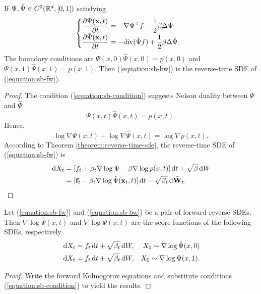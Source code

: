 \begin{theorem}
 If $\Psi,\hat{\Psi}\in C^2(\mathbb{R}^d,[0,1])$ satisfying
 \begin{equation}
  \label{equation:sb-condition}
  \begin{cases}
   \dfrac{\partial\Psi(\mathbf{x},t)}{\partial t} = -\nabla \Psi^\top f-\dfrac{1}{2}\beta\Delta\Psi                      \\
   \dfrac{\partial\hat{\Psi}(\mathbf{x},t)}{\partial t} = -\mathrm{div} (\hat{\Psi} f)+\dfrac{1}{2}\beta\Delta\hat{\Psi} \\
  \end{cases}
 \end{equation}
 The boundary conditions are $\Psi(x,0)\hat{\Psi}(x,0)=p(x,0)$ and $\Psi(x,1)\hat{\Psi}(x,1)=p(x,1)$.
 Then (\ref{equation:sb-bw}) is the reverse-time SDE of (\ref{equation:sb-fw}).
\end{theorem}
\begin{proof}
 The condition (\ref{equation:sb-condition}) suggests Nelson duality between $\Psi$ and $\hat{\Psi}$ \cite{nelson2020dynamical}
 $$\Psi(x,t)\hat{\Psi}(x,t)=p(x,t).$$
 Hence,
 $$\log\nabla\Psi(x,t) + \log\nabla\hat{\Psi}(x,t)=\log\nabla p(x,t).$$
 According to Theorem \ref{theorem:reverse-time-sde}, the reverse-time SDE of (\ref{equation:sb-fw}) is
 \begin{align*}
  \,\mathrm{d} X_t
   & = [f_t + \beta_t\nabla\log \Psi - \beta\nabla\log p(x,t)]\,\mathrm{d} t + \sqrt{\beta}\,\mathrm{d} W                             \\
   & = [\mathbf{f}_t - \beta_t\nabla\log\hat{\Psi}(\mathbf{x}_t,t)]\,\mathrm{d} t-\sqrt{\beta_t}\,\mathrm{d} \bar{\mathbf{W}}_t.
 \end{align*}
\end{proof}

\begin{theorem}
 Let (\ref{equation:sb-fw}) and (\ref{equation:sb-bw}) be a pair of forward-reverse SDEs. Then $\nabla\log\hat{\Psi}(x,t)$ and $\nabla\log{\Psi}(x,t)$ are the score functions of the following SDEs, respectively
 \begin{align}
  \label{equation:sde-psihat}
  \,\mathrm{d} X_t & = f_t\,\mathrm{d} t + \sqrt{\beta_t} \,\mathrm{d} W, & X_0\sim \nabla\log\hat{\Psi}(x,0) \\
  \label{equation:sde-psi}
  \,\mathrm{d} X_t & = f_t\,\mathrm{d} t + \sqrt{\beta_t} \,\mathrm{d} W, & X_0\sim \nabla\log{\Psi}(x,1).
 \end{align}
\end{theorem}
\begin{proof}
 Write the forward Kolmogorov equations and substitute conditions (\ref{equation:sb-condition}) to yield the results.
\end{proof}